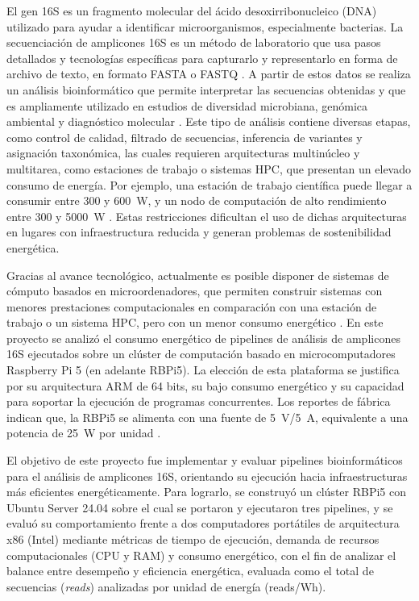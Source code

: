\documentclass[12pt,oneside,spanish]{book}
\begin{document}
    El gen 16S es un fragmento molecular del ácido desoxirribonucleico (DNA) utilizado para ayudar a identificar microorganismos, especialmente bacterias. La secuenciación de amplicones 16S es un método de laboratorio que usa pasos detallados y tecnologías específicas para capturarlo y representarlo en forma de archivo de texto, en formato FASTA o FASTQ \citep{cock2010fastq}. A partir de estos datos se realiza un análisis bioinformático que permite interpretar las secuencias obtenidas y que es ampliamente utilizado en estudios de diversidad microbiana, genómica ambiental y diagnóstico molecular \citep{clarridge2004}. Este tipo de análisis contiene diversas etapas, como control de calidad, filtrado de secuencias, inferencia de variantes y asignación taxonómica, las cuales requieren arquitecturas multinúcleo y multitarea, como estaciones de trabajo o sistemas HPC, que presentan un elevado consumo de energía. Por ejemplo, una estación de trabajo científica puede llegar a consumir entre 300 y 600~W, y un nodo de computación de alto rendimiento entre 300 y 5000~W \citep{cox2014iridis}. Estas restricciones dificultan el uso de dichas arquitecturas en lugares con infraestructura reducida y generan problemas de sostenibilidad energética.
    
    Gracias al avance tecnológico, actualmente es posible disponer de sistemas de cómputo basados en microordenadores, que permiten construir sistemas con menores prestaciones computacionales en comparación con una estación de trabajo o un sistema HPC, pero con un menor consumo energético \citep{pyrhonen2025energy}. En este proyecto se analizó el consumo energético de pipelines de análisis de amplicones 16S ejecutados sobre un clúster de computación basado en microcomputadores Raspberry Pi 5 (en adelante RBPi5). La elección de esta plataforma se justifica por su arquitectura ARM de 64 bits, su bajo consumo energético y su capacidad para soportar la ejecución de programas concurrentes. Los reportes de fábrica indican que, la RBPi5 se alimenta con una fuente de 5~V/5~A, equivalente a una potencia de 25~W por unidad \citep{rpi2023brief}.
    
    El objetivo de este proyecto fue implementar y evaluar pipelines bioinformáticos para el análisis de amplicones 16S, orientando su ejecución hacia infraestructuras más eficientes energéticamente. Para lograrlo, se construyó un clúster RBPi5 con Ubuntu Server 24.04 sobre el cual se portaron y ejecutaron tres pipelines, y se evaluó su comportamiento frente a dos computadores portátiles de arquitectura x86 (Intel) mediante métricas de tiempo de ejecución, demanda de recursos computacionales (CPU y RAM) y consumo energético, con el fin de analizar el balance entre desempeño y eficiencia energética, evaluada como el total de secuencias (\textit{reads}) analizadas por unidad de energía (reads/Wh).
    
\end{document}
